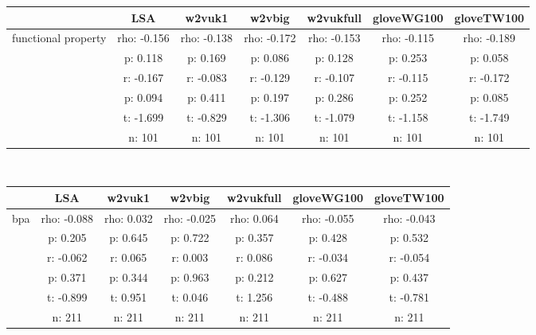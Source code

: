 \documentclass{article}
\begin{document}
\begin{tabular}{ccccccc|}\cline{2-7}
&\multicolumn{1}{|c}{LSA} & w2vuk1 & w2vbig & w2vukfull & gloveWG100 & gloveTW100 \\\hline
\multicolumn{1}{|c|}{\multirow{6}{*}{functional property}} & rho: -0.156 & rho: -0.138 & rho: -0.172 & rho: -0.153 & rho: -0.115 & rho: -0.189 \\
\multicolumn{1}{|c|}{} & p: 0.118 & p: 0.169 & p: 0.086 & p: 0.128 & p: 0.253 & p: 0.058 \\
\multicolumn{1}{|c|}{} & r: -0.167 & r: -0.083 & r: -0.129 & r: -0.107 & r: -0.115 & r: -0.172 \\
\multicolumn{1}{|c|}{} & p: 0.094 & p: 0.411 & p: 0.197 & p: 0.286 & p: 0.252 & p: 0.085 \\
\multicolumn{1}{|c|}{} & t: -1.699 & t: -0.829 & t: -1.306 & t: -1.079 & t: -1.158 & t: -1.749 \\
\multicolumn{1}{|c|}{} & n: 101 & n: 101 & n: 101 & n: 101 & n: 101 & n: 101 \\
\hline
\end{tabular}\\
\begin{tabular}{ccccccc|}\cline{2-7}
&\multicolumn{1}{|c}{LSA} & w2vuk1 & w2vbig & w2vukfull & gloveWG100 & gloveTW100 \\\hline
\multicolumn{1}{|c|}{\multirow{6}{*}{bpa}} & rho: -0.088 & rho: 0.032 & rho: -0.025 & rho: 0.064 & rho: -0.055 & rho: -0.043 \\
\multicolumn{1}{|c|}{} & p: 0.205 & p: 0.645 & p: 0.722 & p: 0.357 & p: 0.428 & p: 0.532 \\
\multicolumn{1}{|c|}{} & r: -0.062 & r: 0.065 & r: 0.003 & r: 0.086 & r: -0.034 & r: -0.054 \\
\multicolumn{1}{|c|}{} & p: 0.371 & p: 0.344 & p: 0.963 & p: 0.212 & p: 0.627 & p: 0.437 \\
\multicolumn{1}{|c|}{} & t: -0.899 & t: 0.951 & t: 0.046 & t: 1.256 & t: -0.488 & t: -0.781 \\
\multicolumn{1}{|c|}{} & n: 211 & n: 211 & n: 211 & n: 211 & n: 211 & n: 211 \\
\hline
\end{tabular}\\
\end{document}
